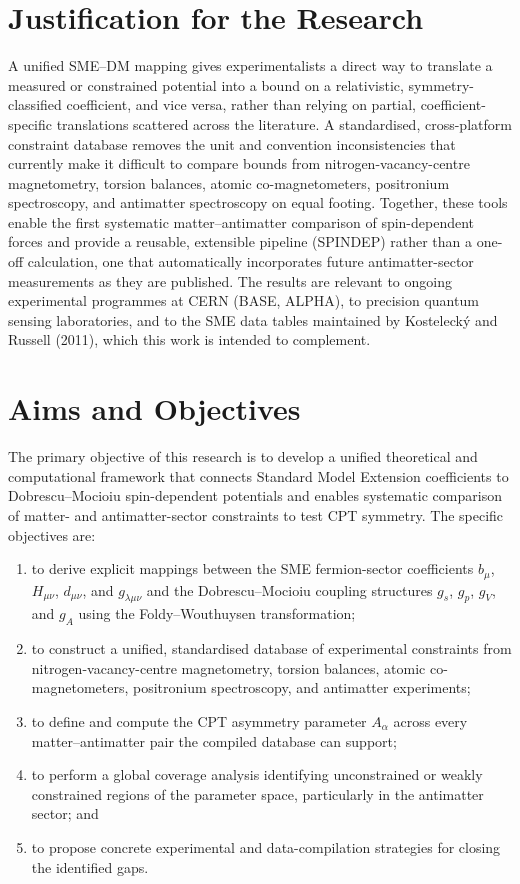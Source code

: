 \section{Justification for the Research}

A unified SME--DM mapping gives experimentalists a direct way to translate
a measured or constrained potential into a bound on a relativistic,
symmetry-classified coefficient, and vice versa, rather than relying on
partial, coefficient-specific translations scattered across the
literature. A standardised, cross-platform constraint database removes the
unit and convention inconsistencies that currently make it difficult to
compare bounds from nitrogen-vacancy-centre magnetometry, torsion balances,
atomic co-magnetometers, positronium spectroscopy, and antimatter
spectroscopy on equal footing. Together, these tools enable the first
systematic matter--antimatter comparison of spin-dependent forces and
provide a reusable, extensible pipeline (SPINDEP) rather than a one-off
calculation, one that automatically incorporates future antimatter-sector
measurements as they are published. The results are relevant to ongoing
experimental programmes at CERN (BASE, ALPHA), to precision quantum sensing
laboratories, and to the SME data tables maintained by Kostelecký and
Russell (2011), which this work is intended to complement.

\section{Aims and Objectives}

The primary objective of this research is to develop a unified theoretical
and computational framework that connects Standard Model Extension
coefficients to Dobrescu--Mocioiu spin-dependent potentials and enables
systematic comparison of matter- and antimatter-sector constraints to test
CPT symmetry. The specific objectives are:

\begin{enumerate}
  \item to derive explicit mappings between the SME fermion-sector
    coefficients $b_\mu$, $H_{\mu\nu}$, $d_{\mu\nu}$, and $g_{\lambda\mu\nu}$
    and the Dobrescu--Mocioiu coupling structures $g_s$, $g_p$, $g_V$, and $g_A$
    using the Foldy--Wouthuysen transformation;
  \item to construct a unified, standardised database of experimental
    constraints from nitrogen-vacancy-centre magnetometry, torsion
    balances, atomic co-magnetometers, positronium spectroscopy, and
    antimatter experiments;
  \item to define and compute the CPT asymmetry parameter $A_\alpha$ across
    every matter--antimatter pair the compiled database can support;
  \item to perform a global coverage analysis identifying unconstrained or
    weakly constrained regions of the parameter space, particularly in the
    antimatter sector; and
  \item to propose concrete experimental and data-compilation strategies
    for closing the identified gaps.
\end{enumerate}

